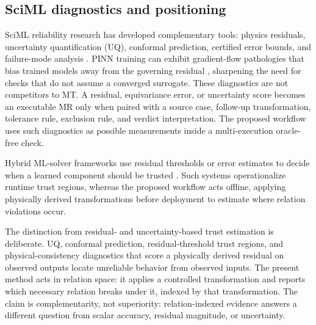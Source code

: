 \documentclass[preprint,12pt,authoryear]{elsarticle}
\begin{document}
\subsection{SciML diagnostics and positioning}
\label{subsec:sciml-vv}
\label{subsec:hybrid-trust}
\label{subsec:new-not-new}

SciML reliability research has developed complementary tools: physics residuals, uncertainty quantification (UQ), conformal prediction, certified error bounds, and failure-mode analysis \citep{raissi2019pinn,karniadakis2021piml,li2021fno,krishnapriyan2021failure,gopakumar2025calibrated}. PINN training can exhibit gradient-flow pathologies that bias trained models away from the governing residual \citep{wang2021gradflow,krishnapriyan2021failure}, sharpening the need for checks that do not assume a converged surrogate. These diagnostics are not competitors to MT. A residual, equivariance error, or uncertainty score becomes an executable MR only when paired with a source case, follow-up transformation, tolerance rule, exclusion rule, and verdict interpretation. The proposed workflow uses such diagnostics as possible measurements inside a multi-execution oracle-free check.

Hybrid ML-solver frameworks use residual thresholds or error estimates to decide when a learned component should be trusted \citep{baral2025xrepit,wang2025deeponetfe}. Such systems operationalize runtime trust regions, whereas the proposed workflow acts offline, applying physically derived transformations before deployment to estimate where relation violations occur.

The distinction from residual- and uncertainty-based trust estimation is deliberate. UQ, conformal prediction, residual-threshold trust regions, and physical-consistency diagnostics that score a physically derived residual on observed outputs \citep{najafi2026} locate unreliable behavior from observed inputs. The present method acts in relation space: it applies a controlled transformation and reports which necessary relation breaks under it, indexed by that transformation. The claim is complementarity, not superiority: relation-indexed evidence answers a different question from scalar accuracy, residual magnitude, or uncertainty.
\end{document}
